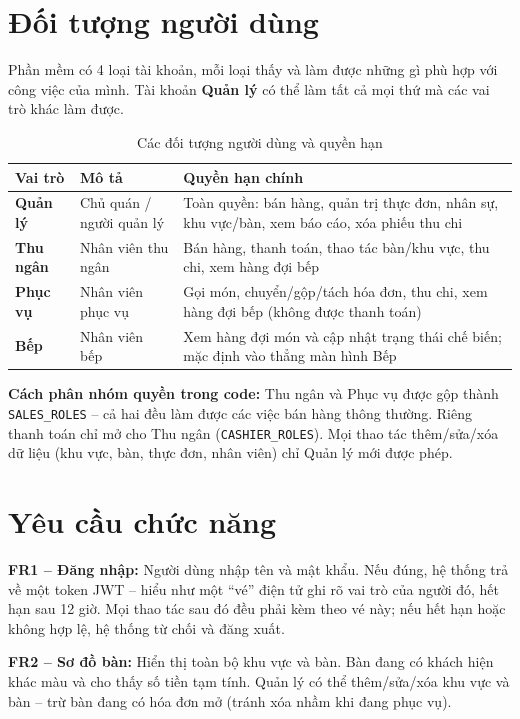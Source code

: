 \documentclass[12pt,a4paper]{report}
\newcommand{\code}[1]{\texttt{#1}}
\begin{document}
\section{Đối tượng người dùng}

Phần mềm có 4 loại tài khoản, mỗi loại thấy và làm được những gì phù hợp với công việc của mình. Tài khoản \textbf{Quản lý} có thể làm tất cả mọi thứ mà các vai trò khác làm được.

\begin{table}[H]
\centering
\caption{Các đối tượng người dùng và quyền hạn}
\begin{tabularx}{\textwidth}{L{2.2cm} L{3cm} X}
\toprule
\textbf{Vai trò} & \textbf{Mô tả} & \textbf{Quyền hạn chính} \\
\midrule
\textbf{Quản lý} & Chủ quán / người quản lý & Toàn quyền: bán hàng, quản trị thực đơn, nhân sự, khu vực/bàn, xem báo cáo, xóa phiếu thu chi \\
\textbf{Thu ngân} & Nhân viên thu ngân & Bán hàng, thanh toán, thao tác bàn/khu vực, thu chi, xem hàng đợi bếp \\
\textbf{Phục vụ} & Nhân viên phục vụ & Gọi món, chuyển/gộp/tách hóa đơn, thu chi, xem hàng đợi bếp (không được thanh toán) \\
\textbf{Bếp} & Nhân viên bếp & Xem hàng đợi món và cập nhật trạng thái chế biến; mặc định vào thẳng màn hình Bếp \\
\bottomrule
\end{tabularx}
\end{table}

\textbf{Cách phân nhóm quyền trong code:} Thu ngân và Phục vụ được gộp thành \code{SALES\_ROLES} -- cả hai đều làm được các việc bán hàng thông thường. Riêng thanh toán chỉ mở cho Thu ngân (\code{CASHIER\_ROLES}). Mọi thao tác thêm/sửa/xóa dữ liệu (khu vực, bàn, thực đơn, nhân viên) chỉ Quản lý mới được phép.

\section{Yêu cầu chức năng}

\textbf{FR1 -- Đăng nhập:} Người dùng nhập tên và mật khẩu. Nếu đúng, hệ thống trả về một token JWT -- hiểu như một ``vé'' điện tử ghi rõ vai trò của người đó, hết hạn sau 12 giờ. Mọi thao tác sau đó đều phải kèm theo vé này; nếu hết hạn hoặc không hợp lệ, hệ thống từ chối và đăng xuất.

\textbf{FR2 -- Sơ đồ bàn:} Hiển thị toàn bộ khu vực và bàn. Bàn đang có khách hiện khác màu và cho thấy số tiền tạm tính. Quản lý có thể thêm/sửa/xóa khu vực và bàn -- trừ bàn đang có hóa đơn mở (tránh xóa nhầm khi đang phục vụ).
\end{document}
